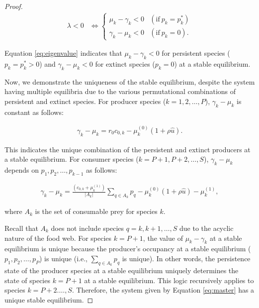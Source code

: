 \documentclass[11pt, class=article, crop=false]{standalone}
\theoremstyle{definition}
\begin{document}
\begin{proof}
\begin{align}
    \lambda < 0 &\Leftrightarrow 
    \left\{
    \begin{array}{cc}
         \mu_k - \gamma_k < 0   &(\text{if}~ p_k = p_k^*)\\
         \gamma_k - \mu_k < 0   &(\text{if}~ p_k = 0) .
    \end{array}
    \right.
    \label{eq:eigenvalue}
\end{align}

Equation \ref{eq:eigenvalue} indicates that $\mu_k - \gamma_k < 0$ for persistent species ($p_k = p_k^*>0$) and $\gamma_k - \mu_k < 0$ for extinct species ($p_k=0$) at a stable equilibrium.

Now, we demonstrate the uniqueness of the stable equilibrium, despite the system having multiple equilibria due to the various permutational combinations of persistent and extinct species.
For producer species ($k=1,2,\ldots, P$), $\gamma_k-\mu_k$ is constant as follows:

\begin{align}
    \gamma_k-\mu_k = r_0 c_{0, k} - \mu_{k}^{(0)} (1 + \rho \hat{u}).
\end{align}

This indicates the unique combination of the persistent and extinct producers at a stable equilibrium.
For consumer species ($k = P+1, P+2,\ldots, S$), $\gamma_k-\mu_k$ depends on $p_1, p_2, \ldots, p_{k-1}$ as follows:

\begin{align}
    \gamma_k-\mu_k = \frac{\left(c_{0, k}+\mu_{k}^{(1)}\right)}{|A_k|}\sum_{q \in A_k} p_q
- \mu_{k}^{(0)} (1 + \rho \hat{u})-\mu_{k}^{(1)} ,
\end{align}

where $A_k$ is the set of consumable prey for species $k$.

Recall that $A_k$ does not include species $q = k, k+1, \ldots, S$ due to the acyclic nature of the food web.
For species $k = P+1$, the value of $\mu_k-\gamma_k$ at a stable equilibrium is unique because the producer's occupancy at a stable equilibrium ($p_1, p_2, \ldots, p_P$) is unique (i.e., $\sum_{q \in A_k} p_q$ is unique).
In other words, the persistence state of the producer species at a stable equilibrium uniquely determines the state of species $k = P+1$ at a stable equilibrium.
This logic recursively applies to species $k=P+2. \ldots, S$.
Therefore, the system given by Equation \ref{eq:master} has a unique stable equilibrium.
\end{proof}
\end{document}
